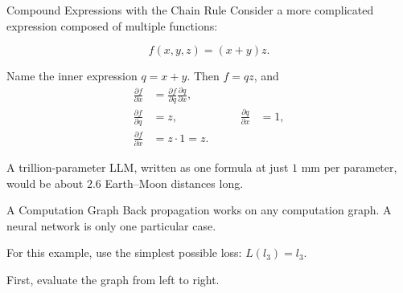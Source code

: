 \documentclass[aspectratio=169]{beamer}
\begin{document}
\begin{frame}{Compound Expressions with the Chain Rule}
  Consider a more complicated expression composed of multiple functions:

  \begin{equation*}
    f(x,y,z)=(x+y)z.
  \end{equation*}

  Name the inner expression $q=x+y$. Then $f=qz$, and
  \begin{align*}
    \frac{\partial f}{\partial x}
      &= \frac{\partial f}{\partial q}
         \frac{\partial q}{\partial x}, \\
    \frac{\partial f}{\partial q} &= z,
    &\qquad
    \frac{\partial q}{\partial x} &= 1, \\
    \frac{\partial f}{\partial x}
      &= z \cdot 1 = z.
  \end{align*}

  \vfill
  {\footnotesize
    A trillion-parameter LLM, written as one formula at just $1$ mm per
    parameter, would be about $2.6$ Earth--Moon distances long.
  }
\end{frame}

\begin{frame}{A Computation Graph}
  Back propagation works on any computation graph. A neural network is only
  one particular case.

  For this example, use the simplest possible loss: $L(l_3)=l_3$.

  \centering

  \vspace{0.5em}
  First, evaluate the graph from left to right.
\end{frame}
\end{document}
